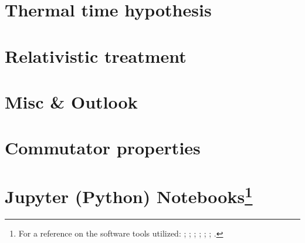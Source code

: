 \iftodo
\chapter{Thermal time hypothesis}

\fi

\chapter{Relativistic treatment}

\iftodo

\fi

\iftodo
\chapter{Misc \& Outlook}

\fi

\appendix

\chapter{Commutator properties}


\chapter[Jupyter (Python) Notebooks]{Jupyter (Python) Notebooks\footnote{
  For a reference on the software tools utilized:
  \cite{comp:python+sci};
  \cite{comp:scipy};
  \cite{comp:sympy};
  \cite{comp:jupyter};
  \cite{comp:matplotlib};
  \cite{comp:numpy};
  \cite{comp:python+sci+eng}.
}}



\printbibliography[heading=bibintoc]


